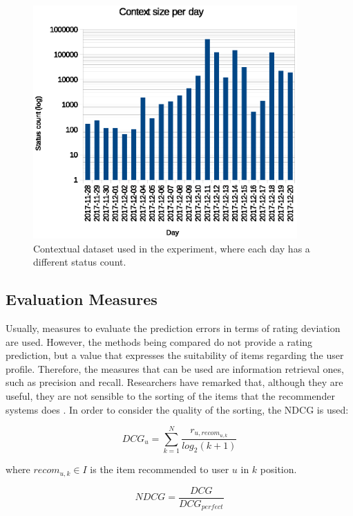 \documentclass[preprint]{elsarticle}
\begin{document}
\begin{spacing}{1.5}
\begin{figure}[htb]
    \centering
    \includegraphics[width=0.9\textwidth]{figures/context-dataset-description.eps}
    \caption{Contextual dataset used in the experiment, where each day has a different status count.}
    \label{fig:context-dataset-description}
\end{figure}

\subsection{Evaluation Measures}

Usually, measures to evaluate the prediction errors in terms of rating deviation are used. However, the methods being compared do not provide a rating prediction, but a value that expresses the suitability of items regarding the user profile. Therefore, the measures that can be used are information retrieval ones, such as precision and recall. Researchers have remarked that, although they are useful, they are not sensible to the sorting of the items that the recommender systems does \cite{Gunawardana2015}. In order to consider the quality of the sorting, the NDCG is used:

\begin{equation}
	DCG_u = \sum_{k=1}^N\frac{r_{u,recom_{u,k}}}{log_2 (k+1)}
\end{equation}

\noindent where $recom_{u,k} \in I$ is the item recommended to user $u$ in $k$ position.

\begin{equation}
	NDCG = \frac{DCG}{DCG_{perfect}}
\end{equation}


\end{spacing}
\end{document}
